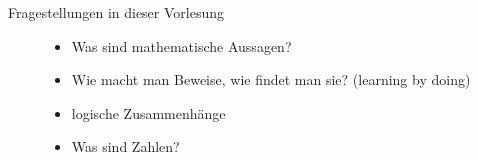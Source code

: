 \documentclass[../ana2.tex]{subfiles}
\begin{document}
\begin{prosa}
\begin{description}
	\item[Fragestellungen in dieser Vorlesung]\leavevmode
		\begin{itemize}[-]
			\item Was sind mathematische Aussagen?
			\item Wie macht man Beweise, wie findet man sie? (learning by doing)
			\item logische Zusammenhänge
			\item Was sind Zahlen?
		\end{itemize} 
\end{description}

\end{prosa}
\end{document}
